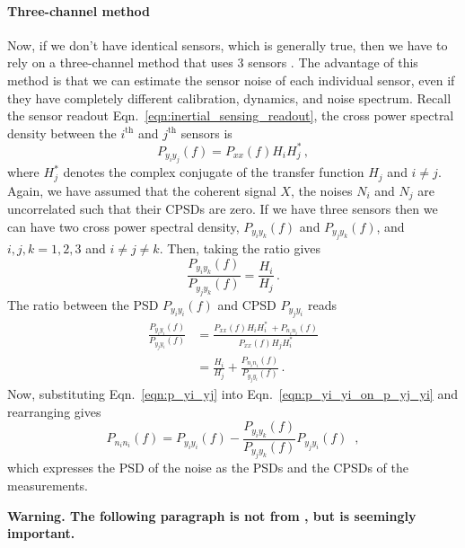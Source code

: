 \paragraph{Three-channel method}

Now, if we don't have identical sensors, which is generally true, then we have to rely on a three-channel method that uses 3 sensors \cite{Sleeman2006ThreeChannelCA}.
The advantage of this method is that we can estimate the sensor noise of each individual sensor, even if they have completely different calibration, dynamics, and noise spectrum.
Recall the sensor readout Eqn.~\eqref{eqn:inertial_sensing_readout}, the cross power spectral density between the $i^\mathrm{th}$ and $j^\mathrm{th}$ sensors is
\begin{equation}
	P_{y_iy_j}(f) = P_{xx}(f)H_iH_j^*\,,
\end{equation}
where $H_j^*$ denotes the complex conjugate of the transfer function $H_j$ and $i\neq j$.
Again, we have assumed that the coherent signal $X$, the noises $N_i$ and $N_j$ are uncorrelated such that their CPSDs are zero.
If we have three sensors then we can have two cross power spectral density, $P_{y_iy_k}(f)$ and $P_{y_jy_k}(f)$, and $i,j,k=1,2,3$ and $i\neq j\neq k$.
Then, taking the ratio gives
\begin{equation}
	\frac{P_{y_iy_k}(f)}{P_{y_jy_k}(f)} = \frac{H_i}{H_j}\,.
	\label{eqn:p_yi_yj}
\end{equation}
The ratio between the PSD $P_{y_iy_i}(f)$ and CPSD $P_{y_jy_i}$ reads
\begin{equation}
	\begin{split}
	\frac{P_{y_iy_i}(f)}{P_{y_jy_i}(f)} &= \frac{P_{xx}(f)H_iH_i^*\ + P_{n_in_i}(f)}{P_{xx}(f)H_jH_i^*} \\
	&= \frac{H_i}{H_j} + \frac{P_{n_in_i}(f)}{P_{y_jy_i}(f)}\,.
	\end{split}
	\label{eqn:p_yi_yi_on_p_yj_yi}
\end{equation}
Now, substituting Eqn.~\eqref{eqn:p_yi_yj} into Eqn.~\eqref{eqn:p_yi_yi_on_p_yj_yi} and rearranging gives
\begin{equation}
	\boxed{
		P_{n_in_i}(f) = P_{y_iy_i}(f) - \frac{P_{y_iy_k}(f)}{P_{y_jy_k}(f)}P_{y_jy_i}(f)\,
	}\,\ ,
	\label{eqn:p_ni_ni_3channel}
\end{equation}
which expresses the PSD of the noise as the PSDs and the CPSDs of the measurements.

\textbf{Warning. The following paragraph is not from \cite{Sleeman2006ThreeChannelCA}, but is seemingly important.}

